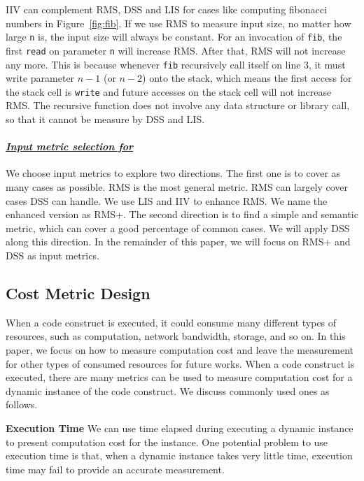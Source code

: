 IIV can complement RMS, DSS and LIS for cases like 
computing fibonacci numbers in Figure~\ref{fig:fib}. 
If we use RMS to measure input size,
no matter how large \texttt{n} is, the input size will always be constant. 
For an invocation of \texttt{fib},
the first \texttt{read} on parameter \texttt{n} will increase RMS.
After that, RMS will not increase any more.
This is because whenever \texttt{fib} recursively call itself on line 3,
it must write parameter $n-1$ (or $n-2$) onto the stack, 
which means the first access for the stack cell is \texttt{write} 
and future accesses on the stack cell will not increase RMS. 
The recursive function does not
involve any data structure or library call, 
so that it cannot be measure by DSS and LIS. 
 

\paragraph{\textit{\underline{Input metric selection for \Tool}}}
We choose input metrics to explore two directions. 
The first one is to cover as many cases as possible. 
RMS is the most general metric.
RMS can largely cover cases DSS can handle.
We use LIS and IIV to enhance RMS.
We name the enhanced version as RMS+.
The second direction is to find a simple and semantic metric, 
which can cover  a good percentage of common cases. 
We will apply DSS along this direction. 
In the remainder of this paper, 
we will focus on RMS+ and DSS as input metrics. 

\subsection{Cost Metric Design}
When a code construct is executed, 
it could consume many different types of resources, 
such as computation, network bandwidth, storage, and so on.
In this paper, we focus on how to measure computation cost and 
leave the measurement for other types of consumed resources for future works. 
When a code construct is executed, 
there are many metrics can be used to measure computation 
cost for a dynamic instance of the code construct. 
We discuss commonly used ones as follows.

\noindent\textbf{Execution Time}
We can use time elapsed during executing a dynamic instance to present computation cost 
for the instance.
One potential problem to use execution time is that, 
when a dynamic instance takes very little time, 
execution time may fail to provide an accurate measurement.  

